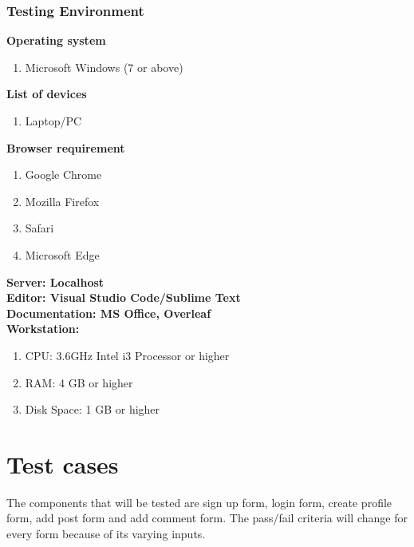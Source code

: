 \documentclass[12pt]{article}
\begin{document}
	\subsubsection{Testing Environment}
	\textbf{Operating system} 
	\begin{enumerate}
		\item Microsoft Windows (7 or above)
	\end{enumerate}
	\textbf{List of devices}
		\begin{enumerate}
			\item Laptop/PC
		\end{enumerate}
	\textbf{Browser requirement}
	\begin{enumerate}
	\item Google Chrome
	\item Mozilla Firefox
	\item Safari
	\item Microsoft Edge
	\end{enumerate}
	\textbf{Server: Localhost} \\
	\textbf{Editor: Visual Studio Code/Sublime Text}\\
	\textbf{Documentation: MS Office, Overleaf}\\
	\textbf{Workstation:} \\
		\begin{enumerate}
			\item CPU: 3.6GHz Intel i3 Processor or higher
			\item RAM: 4 GB or higher
			\item Disk Space: 1 GB or higher
		\end{enumerate}
	\pagebreak

\section{Test cases}
The components that will be tested are sign up form, login form, create profile form, add post form and add comment form. The pass/fail criteria will change for every form because of its varying inputs.
\end{document}
